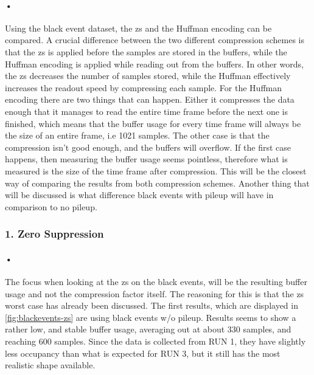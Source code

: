 \documentclass[a4paper, 12pt, openright, twoside]{report}
\begin{document}
\paragraph{•}
Using the black event dataset, the \gls{zs} and the Huffman encoding can be compared.
A crucial difference between the two different compression schemes is that the \gls{zs} is applied before the samples are stored in the buffers, while the Huffman encoding is applied while reading out from the buffers.
In other words, the \gls{zs} decreases the number of samples stored, while the Huffman effectively increases the readout speed by compressing each sample.
For the Huffman encoding there are two things that can happen.
Either it compresses the data enough that it manages to read the entire time frame before the next one is finished, which means that the buffer usage for every time frame will always be the size of an entire frame, i.e 1021 samples.
The other case is that the compression isn't good enough, and the buffers will overflow.
If the first case happens, then measuring the buffer usage seems pointless, therefore what is measured is the size of the time frame after compression.
This will be the closest way of comparing the results from both compression schemes.
Another thing that will be discussed is what difference black events with pileup will have in comparison to no pileup.


\subsubsection{1. Zero Suppression}

\paragraph{•}
The focus when looking at the \gls{zs} on the black events, will be the resulting buffer usage and not the compression factor itself.
The reasoning for this is that the \gls{zs} worst case has already been discussed.
The first results, which are displayed in \ref{fig:blackevents-zs} are using black events w/o pileup.
Results seems to show a rather low, and stable buffer usage, averaging out at about 330 samples, and reaching 600 samples.
Since the data is collected from RUN 1, they have slightly less occupancy than what is expected for RUN 3, but it still has the most realistic shape available.
\end{document}
